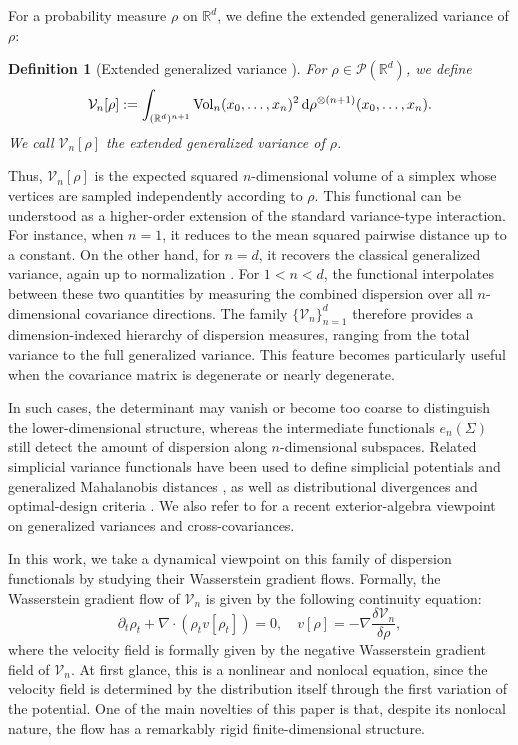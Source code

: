 \documentclass[11pt,reqno]{amsart}
\numberwithin{figure}{section}
\def\d {{\partial}}
\newcommand{\bbr}{\mathbb R}
\def\d{\mathrm{d}}
\renewcommand{\d}{  {\textup{d}} }
\newtheorem{definition}{Definition}[section]
\begin{document}
 

 For a probability measure $\rho$ on $\bbr^d$,  we define the extended generalized variance of $\rho$:
\begin{definition}[Extended generalized variance {\cite{pronzato2017extended}}]
	For $\rho\in\mathcal P(\mathbb R^d)$, we define
	\[
	\mathcal V_n[\rho]
	:=
	\int_{(\mathbb R^d)^{n+1}}
	\mathrm{Vol}_n(x_0,\dots,x_n)^2\,\d\rho^{\otimes(n+1)}(x_0,\dots,x_n).
	\]
	We call $\mathcal V_n[\rho]$ the extended generalized variance of $\rho$.
\end{definition}
Thus, $\mathcal V_n[\rho]$ is the expected squared $n$-dimensional volume of a simplex whose vertices are sampled independently according to $\rho$. This functional can be understood as a higher-order extension of the standard variance-type interaction. For instance, when $n=1$, it reduces to the mean squared pairwise distance up to a constant. On the other hand, for $n=d$, it recovers the classical generalized variance, again up to normalization \cite{pronzato2017extended, wilks1932certain}.  For $1<n<d$, the functional interpolates between these two quantities by measuring the combined dispersion over all $n$-dimensional covariance directions. The family $\{\mathcal V_n\}_{n=1}^d$ therefore provides a dimension-indexed hierarchy of dispersion measures, ranging from the total variance to the full generalized variance. This feature becomes particularly useful when the covariance matrix is degenerate or nearly degenerate.

 
 In such cases, the determinant may vanish or become too coarse to distinguish the lower-dimensional structure, whereas the intermediate functionals $e_n(\Sigma)$ still detect the amount of dispersion along $n$-dimensional subspaces.  Related simplicial variance functionals have been
used to define simplicial potentials and generalized Mahalanobis distances
\cite{pronzato2018simplicial}, as well as distributional divergences and optimal-design
criteria \cite{pronzato2018bregman}. We also refer to \cite{WZ} for a recent
exterior-algebra viewpoint on generalized variances and cross-covariances.


In this work, we take a dynamical viewpoint on this family of dispersion functionals by studying their Wasserstein gradient flows. Formally, the Wasserstein gradient flow of $\mathcal V_n$ is given by the following continuity equation:
\[
\partial_t \rho_t + \nabla \cdot (\rho_t v[\rho_t]) =0,\quad v[\rho] = -\nabla \frac{\delta \mathcal V_n}{\delta \rho},
\]
where the velocity field is formally given by the negative Wasserstein gradient field of $\mathcal V_n$. At first glance, this is a nonlinear and nonlocal equation, since the velocity field is determined by the distribution itself through the first variation of the potential. One of the main novelties of this paper is that, despite its nonlocal nature, the flow has a remarkably rigid finite-dimensional structure. 
\end{document}
